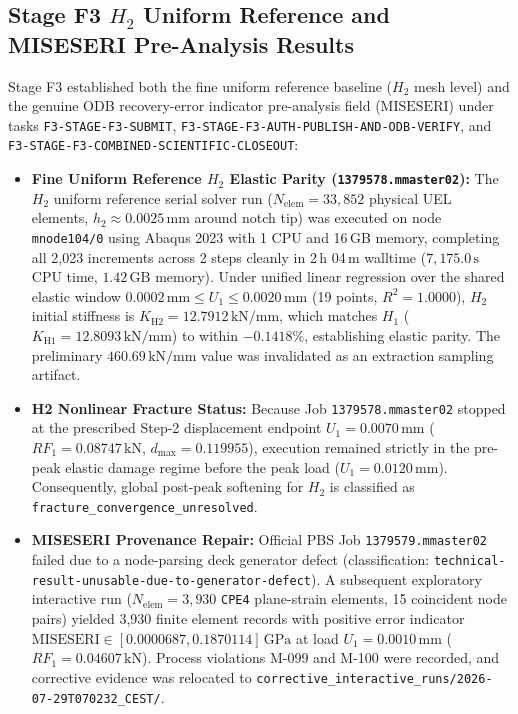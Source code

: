\subsection{Stage F3 $H_2$ Uniform Reference and MISESERI Pre-Analysis Results}
Stage F3 established both the fine uniform reference baseline ($H_2$ mesh level) and the genuine ODB recovery-error indicator pre-analysis field ($\text{MISESERI}$) under tasks \texttt{F3-STAGE-F3-SUBMIT}, \texttt{F3-STAGE-F3-AUTH-PUBLISH-AND-ODB-VERIFY}, and \texttt{F3-STAGE-F3-COMBINED-SCIENTIFIC-CLOSEOUT}:
\begin{itemize}
    \item \textbf{Fine Uniform Reference $H_2$ Elastic Parity (\texttt{1379578.mmaster02}):} The $H_2$ uniform reference serial solver run ($N_{\mathrm{elem}} = 33,852$ physical UEL elements, $h_2 \approx 0.0025\,\text{mm}$ around notch tip) was executed on node \texttt{mnode104/0} using Abaqus 2023 with 1 CPU and 16\,GB memory, completing all 2,023 increments across 2 steps cleanly in 2\,h 04\,m walltime ($7,175.0\,\text{s}$ CPU time, $1.42\,\text{GB}$ memory). Under unified linear regression over the shared elastic window $0.0002\,\text{mm} \le U_1 \le 0.0020\,\text{mm}$ (19 points, $R^2 = 1.0000$), $H_2$ initial stiffness is $K_{\mathrm{H2}} = 12.7912\,\text{kN/mm}$, which matches $H_1$ ($K_{\mathrm{H1}} = 12.8093\,\text{kN/mm}$) to within $-0.1418\%$, establishing elastic parity. The preliminary $460.69\,\text{kN/mm}$ value was invalidated as an extraction sampling artifact.
    \item \textbf{H2 Nonlinear Fracture Status:} Because Job \texttt{1379578.mmaster02} stopped at the prescribed Step-2 displacement endpoint $U_1 = 0.0070\,\text{mm}$ ($RF_1 = 0.08747\,\text{kN}$, $d_{\max} = 0.119955$), execution remained strictly in the pre-peak elastic damage regime before the peak load ($U_1 = 0.0120\,\text{mm}$). Consequently, global post-peak softening for $H_2$ is classified as \texttt{fracture\_convergence\_unresolved}.
    \item \textbf{MISESERI Provenance Repair:} Official PBS Job \texttt{1379579.mmaster02} failed due to a node-parsing deck generator defect (classification: \texttt{technical-result-unusable-due-to-generator-defect}). A subsequent exploratory interactive run ($N_{\mathrm{elem}} = 3,930$ \texttt{CPE4} plane-strain elements, 15 coincident node pairs) yielded 3,930 finite element records with positive error indicator $\text{MISESERI} \in [0.0000687, 0.1870114]\,\text{GPa}$ at load $U_1 = 0.0010\,\text{mm}$ ($RF_1 = 0.04607\,\text{kN}$). Process violations M-099 and M-100 were recorded, and corrective evidence was relocated to \texttt{corrective\_interactive\_runs/2026-07-29T070232\_CEST/}.
\end{itemize}

